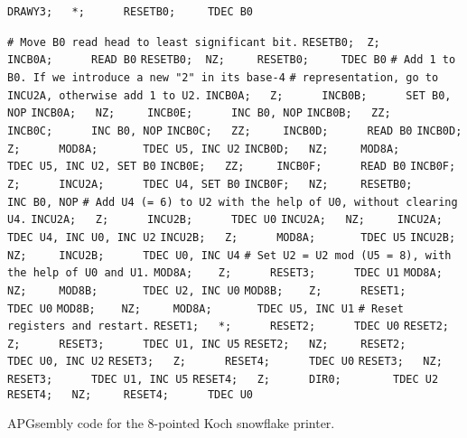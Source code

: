 \begin{apgsembly}
\begin{minipage}[t]{.49\textwidth}
\begin{algorithmic}
			\State \verb|DRAWY3;   *;      RESETB0;     TDEC B0|
		\end{algorithmic}
	\end{minipage}\hfill{\color{gray}\vline}\hfill
	\begin{minipage}[t]{.49\textwidth}
		\begin{algorithmic}\tiny
			\State \verb|# Move B0 read head to least significant bit.|
			\State \verb|RESETB0;  Z;      INCB0A;      READ B0|
			\State \verb|RESETB0;  NZ;     RESETB0;     TDEC B0|
			\State
			\State \verb|# Add 1 to B0. If we introduce a new "2" in its base-4|
			\State \verb|# representation, go to INCU2A, otherwise add 1 to U2.|
			\State \verb|INCB0A;   Z;      INCB0B;      SET B0, NOP|
			\State \verb|INCB0A;   NZ;     INCB0E;      INC B0, NOP|
			\State \verb|INCB0B;   ZZ;     INCB0C;      INC B0, NOP|
			\State \verb|INCB0C;   ZZ;     INCB0D;      READ B0|
			\State \verb|INCB0D;   Z;      MOD8A;       TDEC U5, INC U2|
			\State \verb|INCB0D;   NZ;     MOD8A;       TDEC U5, INC U2, SET B0|
			\State \verb|INCB0E;   ZZ;     INCB0F;      READ B0|
			\State \verb|INCB0F;   Z;      INCU2A;      TDEC U4, SET B0|
			\State \verb|INCB0F;   NZ;     RESETB0;     INC B0, NOP|
			\State
			\State \verb|# Add U4 (= 6) to U2 with the help of U0, without clearing U4.|
			\State \verb|INCU2A;   Z;      INCU2B;      TDEC U0|
			\State \verb|INCU2A;   NZ;     INCU2A;      TDEC U4, INC U0, INC U2|
			\State \verb|INCU2B;   Z;      MOD8A;       TDEC U5|
			\State \verb|INCU2B;   NZ;     INCU2B;      TDEC U0, INC U4|
			\State
			\State \verb|# Set U2 = U2 mod (U5 = 8), with the help of U0 and U1.|
			\State \verb|MOD8A;    Z;      RESET3;      TDEC U1|
			\State \verb|MOD8A;    NZ;     MOD8B;       TDEC U2, INC U0|
			\State \verb|MOD8B;    Z;      RESET1;      TDEC U0|
			\State \verb|MOD8B;    NZ;     MOD8A;       TDEC U5, INC U1|
			\State
			\State \verb|# Reset registers and restart.|
			\State \verb|RESET1;   *;      RESET2;      TDEC U0|
			\State \verb|RESET2;   Z;      RESET3;      TDEC U1, INC U5|
			\State \verb|RESET2;   NZ;     RESET2;      TDEC U0, INC U2|
			\State \verb|RESET3;   Z;      RESET4;      TDEC U0|
			\State \verb|RESET3;   NZ;     RESET3;      TDEC U1, INC U5|
			\State \verb|RESET4;   Z;      DIR0;        TDEC U2|
			\State \verb|RESET4;   NZ;     RESET4;      TDEC U0|
		\end{algorithmic}
	\end{minipage}
	\caption{APGsembly code for the $8$-pointed Koch snowflake printer.}\label{alg:apgsembly_koch}
\end{apgsembly}

